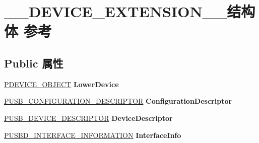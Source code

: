 \hypertarget{struct_____d_e_v_i_c_e___e_x_t_e_n_s_i_o_n____}{}\section{\+\_\+\+\_\+\+D\+E\+V\+I\+C\+E\+\_\+\+E\+X\+T\+E\+N\+S\+I\+O\+N\+\_\+\+\_\+结构体 参考}
\label{struct_____d_e_v_i_c_e___e_x_t_e_n_s_i_o_n____}
\subsection*{Public 属性}
\begin{DoxyCompactItemize}
\item 
\mbox{\label{struct_____d_e_v_i_c_e___e_x_t_e_n_s_i_o_n_____a908b16f41aaf43d1263cf782b1b3291a}} 
\hyperlink{struct___d_e_v_i_c_e___o_b_j_e_c_t}{P\+D\+E\+V\+I\+C\+E\+\_\+\+O\+B\+J\+E\+CT} {\bfseries Lower\+Device}
\item 
\mbox{\label{struct_____d_e_v_i_c_e___e_x_t_e_n_s_i_o_n_____a72212506f35baeec459f1876531c40c4}} 
\hyperlink{struct___u_s_b___c_o_n_f_i_g_u_r_a_t_i_o_n___d_e_s_c_r_i_p_t_o_r}{P\+U\+S\+B\+\_\+\+C\+O\+N\+F\+I\+G\+U\+R\+A\+T\+I\+O\+N\+\_\+\+D\+E\+S\+C\+R\+I\+P\+T\+OR} {\bfseries Configuration\+Descriptor}
\item 
\mbox{\label{struct_____d_e_v_i_c_e___e_x_t_e_n_s_i_o_n_____a75a8de63ee5836220e856c3c0c1f0cbf}} 
\hyperlink{struct___u_s_b___d_e_v_i_c_e___d_e_s_c_r_i_p_t_o_r}{P\+U\+S\+B\+\_\+\+D\+E\+V\+I\+C\+E\+\_\+\+D\+E\+S\+C\+R\+I\+P\+T\+OR} {\bfseries Device\+Descriptor}
\item 
\mbox{\label{struct_____d_e_v_i_c_e___e_x_t_e_n_s_i_o_n_____a245279b99fc451732de786a76f4a652c}} 
\hyperlink{struct___u_s_b_d___i_n_t_e_r_f_a_c_e___i_n_f_o_r_m_a_t_i_o_n}{P\+U\+S\+B\+D\+\_\+\+I\+N\+T\+E\+R\+F\+A\+C\+E\+\_\+\+I\+N\+F\+O\+R\+M\+A\+T\+I\+ON} {\bfseries Interface\+Info}
\item 
\mbox{\label{struct_____d_e_v_i_c_e___e_x_t_e_n_s_i_o_n_____a78f86f14d217a509510fdefa11f1795e}} 

\end{DoxyCompactItemize}
